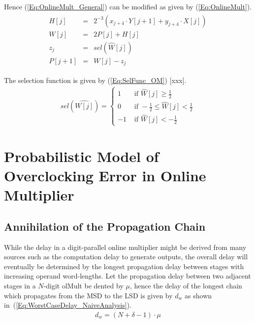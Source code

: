 \documentclass[a4paper, 11pt]{article}
\begin{document}
Hence (\ref{Eq:OnlineMult_General}) can be modified as given by (\ref{Eq:OnlineMult}).
%
\begin{eqnarray}\label{Eq:OnlineMult}
  \begin{matrix}
    H[j] & = & 2^{-3}(x_{j+4}\cdot Y[j+1]+y_{j+4}\cdot X[j])\\
    W[j] & = & 2P[j]+H[j]\\
    z_j  & = & sel(\widehat{W}[j])\\
    P[j+1] & = & W[j]-z_j
  \end{matrix}
\end{eqnarray}

The selection function is given by (\ref{Eq:SelFunc_OM}) [xxx].
\begin{eqnarray}\label{Eq:SelFunc_OM}
  sel(\widehat{W[j]})=\begin{cases}
    1 & \text{ if } \widehat{W}[j] \geqslant \frac{1}{2} \\ 
    0 & \text{ if } -\frac{1}{2}\leqslant\widehat{W}[j]<\frac{1}{2} \\ 
    -1 & \text{ if } \widehat{W}[j]<-\frac{1}{2}
  \end{cases}
\end{eqnarray}


\section{Probabilistic Model of Overclocking Error in Online Multiplier}
\subsection{Annihilation of the Propagation Chain}\label{subSec:AnnihilationOfChain}

While the delay in a digit-parallel online multiplier might be derived from many sources such as the computation delay to generate outputs, the overall delay will eventually be determined by the longest propagation delay between stages with increasing operand word-lengths. Let the propagation delay between two adjacent stages in a $N$-digit olMult be dented by $\mu$, hence the delay of the longest chain which propagates from the MSD to the LSD is given by $d_w$ as shown in~(\ref{Eq:WorstCaseDelay_NaiveAnalysis}).
\begin{eqnarray}\label{Eq:WorstCaseDelay_NaiveAnalysis}
  d_w = (N+\delta-1)\cdot \mu
\end{eqnarray}
\end{document}
